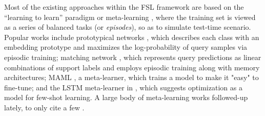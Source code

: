 \documentclass{article}
\begin{document}
    Most of the existing approaches within the FSL framework are based on the ``learning to learn'' paradigm or meta-learning \cite{maml,prototypical_nets,matching_net,relation_net,lee2019meta}, where the training set is viewed as a series of balanced tasks (or \textit{episodes}), so as to simulate test-time scenario. Popular works include prototypical networks \cite{prototypical_nets}, which describes each class with an embedding prototype and maximizes the log-probability of query samples via episodic training; matching network \cite{matching_net}, which represents query predictions as linear combinations of support labels and employs episodic training along with memory architectures; MAML \cite{maml}, a meta-learner, which trains a model to make it "easy" to fine-tune; and the LSTM meta-learner in \cite{ravi2016optimization}, which suggests optimization as a model for few-shot learning. A large body of meta-learning works followed-up lately, to only cite a few \cite{leo,tadam,Mishra18,relation_net,feat}.
\end{document}
